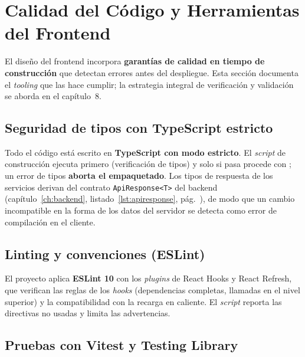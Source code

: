 \section{Calidad del Código y Herramientas del Frontend}
\label{sec:calidad_fe}

El diseño del frontend incorpora \textbf{garantías de calidad en tiempo de construcción}
que detectan errores antes del despliegue. Esta sección documenta el \textit{tooling} que
las hace cumplir; la estrategia integral de verificación y validación se aborda en el
capítulo~8.

\subsection{Seguridad de tipos con TypeScript estricto}
\label{subsec:typescript}

Todo el código está escrito en \textbf{TypeScript con modo estricto}. El \textit{script}
de construcción ejecuta primero  (verificación de tipos) y solo si pasa
procede con ; un error de tipos \textbf{aborta el empaquetado}. Los
tipos de respuesta de los servicios derivan del contrato \texttt{ApiResponse<T>} del
backend (capítulo~\ref{ch:backend}, listado~\ref{lst:apiresponse},
pág.~\pageref{lst:apiresponse}), de modo que un cambio incompatible en la forma de los
datos del servidor se detecta como error de compilación en el cliente.

\subsection{Linting y convenciones (ESLint)}
\label{subsec:eslint}

El proyecto aplica \textbf{ESLint 10} con los \textit{plugins} de React Hooks y React
Refresh, que verifican las reglas de los \textit{hooks} (dependencias completas, llamadas
en el nivel superior) y la compatibilidad con la recarga en caliente. El \textit{script}
 reporta las directivas no usadas y limita las advertencias.

\subsection{Pruebas con Vitest y Testing Library}
\label{subsec:vitest}

